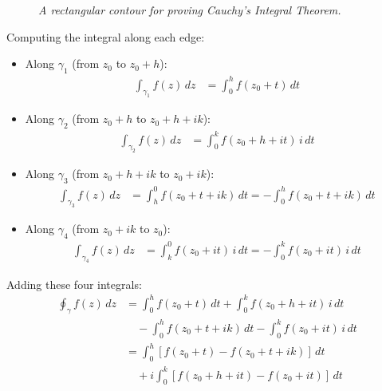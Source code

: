 \begin{figure}[H]
\centering
{}
\caption{\textit{A rectangular contour for proving Cauchy's Integral Theorem.}}
\label{fig:cauchy-proof-rectangle}
\end{figure}

\noindent Computing the integral along each edge:
\begin{itemize}

\item Along $\gamma_1$ (from $z_0$ to $z_0+h$):
\begin{align*}
\int_{\gamma_1} f(z) \, dz &= \int_0^h f(z_0 + t) \, dt
\end{align*}

\item Along $\gamma_2$ (from $z_0+h$ to $z_0+h+ik$):
\begin{align*}
\int_{\gamma_2} f(z) \, dz &= \int_0^k f(z_0 + h + it) \, i \, dt
\end{align*}

\item Along $\gamma_3$ (from $z_0+h+ik$ to $z_0+ik$):
\begin{align*}
\int_{\gamma_3} f(z) \, dz &= \int_h^0 f(z_0 + t + ik) \, dt = -\int_0^h f(z_0 + t + ik) \, dt
\end{align*}

\item Along $\gamma_4$ (from $z_0+ik$ to $z_0$):
\begin{align*}
\int_{\gamma_4} f(z) \, dz &= \int_k^0 f(z_0 + it) \, i \, dt = -\int_0^k f(z_0 + it) \, i \, dt
\end{align*}
\end{itemize}

\noindent Adding these four integrals:
\begin{align*}
\oint_{\gamma} f(z) \, dz &= \int_0^h f(z_0 + t) \, dt + \int_0^k f(z_0 + h + it) \, i \, dt \\
&\quad - \int_0^h f(z_0 + t + ik) \, dt - \int_0^k f(z_0 + it) \, i \, dt \\
&= \int_0^h [f(z_0 + t) - f(z_0 + t + ik)] \, dt \\
&\quad + i\int_0^k [f(z_0 + h + it) - f(z_0 + it)] \, dt
\end{align*}

